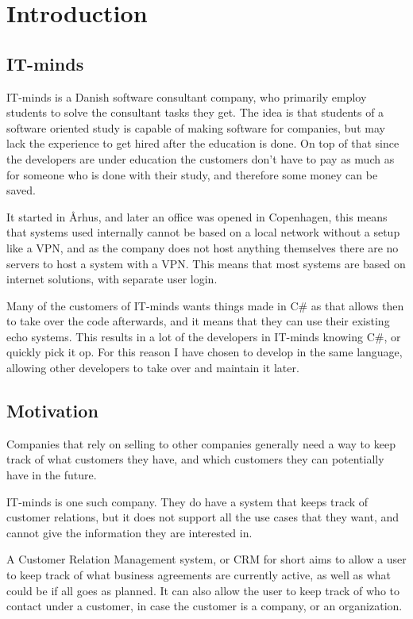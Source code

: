 \chapter{Introduction}
\label{chap:Introduction}

\section{IT-minds}
\label{sec:IT-minds}
IT-minds is a Danish software consultant company, who primarily employ students
to solve the consultant tasks they get. The idea is that students of a software oriented
study is capable of making software for companies, but may lack the experience to get hired
after the education is done. On top of that since the developers are under education
the customers don't have to pay as much as for someone who is done with their study,
and therefore some money can be saved.

It started in Århus, and later an office was opened in Copenhagen, this means that systems
used internally cannot be based on a local network without a setup like a VPN, and as
the company does not host anything themselves there are no servers to host a system with
a VPN. This means that most systems are based on internet solutions, with separate user login.

Many of the customers of IT-minds wants things made in C\# as that allows then to
take over the code afterwards, and it means that they can use their existing echo
systems. This results in a lot of the developers in IT-minds knowing C\#, or
quickly pick it op. For this reason I have chosen to develop in the same language,
allowing other developers to take over and maintain it later.

\section{Motivation}
\label{sec:Motivation}
Companies that rely on selling to other companies generally need a way to keep track of
what customers they have, and which customers they can potentially have in the future.

IT-minds is one such company. They do have a system that keeps track of customer relations,
but it does not support all the use cases that they want, and cannot give the information
they are interested in.

A Customer Relation Management system, or CRM for short aims to allow a user to
keep track of what business agreements are currently active, as well as what
could be if all goes as planned. It can also allow the user to keep track of who
to contact under a customer, in case the customer is a company, or an organization.

